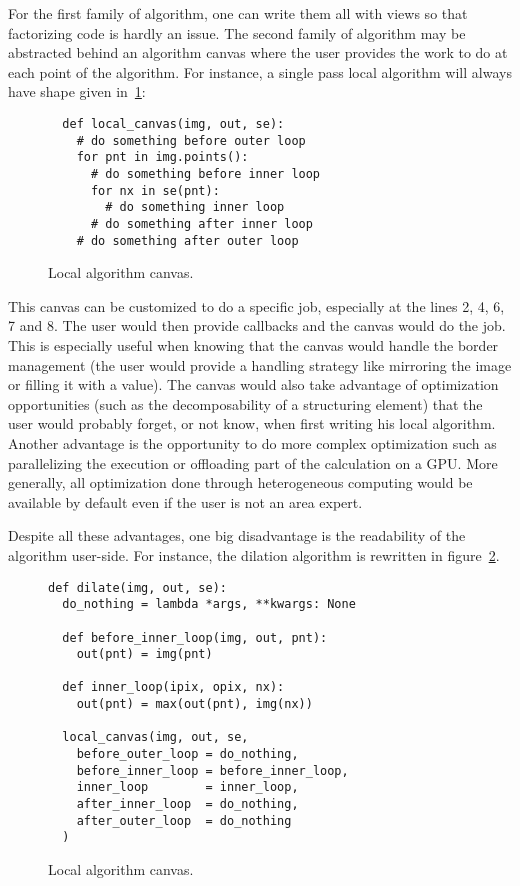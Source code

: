 For the first family of algorithm, one can write them all with views so that factorizing code is hardly an issue. The
second family of algorithm may be abstracted behind an algorithm canvas where the user provides the work to do at each
point of the algorithm. For instance, a single pass local algorithm will always have shape given
in~\ref{fig.local.algorithm.canvas}:
\begin{figure}[tbh]
  \centering
  \begin{verbatim}
  def local_canvas(img, out, se):
    # do something before outer loop
    for pnt in img.points():
      # do something before inner loop
      for nx in se(pnt):
        # do something inner loop
      # do something after inner loop
    # do something after outer loop
  \end{verbatim}

  \caption{Local algorithm canvas.}
  \label{fig.local.algorithm.canvas}
\end{figure}

This canvas can be customized to do a specific job, especially at the lines 2, 4, 6, 7 and 8. The user would then
provide callbacks and the canvas would do the job. This is especially useful when knowing that the canvas would handle
the border management (the user would provide a handling strategy like mirroring the image or filling it with a value).
The canvas would also take advantage of optimization opportunities (such as the decomposability of a structuring
element) that the user would probably forget, or not know, when first writing his local algorithm. Another advantage is
the opportunity to do more complex optimization such as parallelizing the execution or offloading part of the
calculation on a GPU. More generally, all optimization done through heterogeneous computing would be available by
default even if the user is not an area expert.

Despite all these advantages, one big disadvantage is the readability of the algorithm user-side. For instance, the
dilation algorithm is rewritten in figure~\ref{fig.local.algorithm.dilate}.

\begin{figure}[tbh]
  \centering
  \begin{verbatim}
def dilate(img, out, se):
  do_nothing = lambda *args, **kwargs: None

  def before_inner_loop(img, out, pnt):
    out(pnt) = img(pnt)
  
  def inner_loop(ipix, opix, nx):
    out(pnt) = max(out(pnt), img(nx))

  local_canvas(img, out, se,
    before_outer_loop = do_nothing,
    before_inner_loop = before_inner_loop,
    inner_loop        = inner_loop,
    after_inner_loop  = do_nothing,
    after_outer_loop  = do_nothing
  )
  \end{verbatim}

  \caption{Local algorithm canvas.}
  \label{fig.local.algorithm.dilate}
\end{figure}

